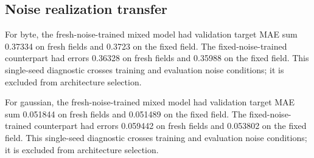 \subsection{Noise realization transfer}

For byte, the fresh-noise-trained mixed model had validation target MAE sum 0.37334 on fresh fields and 0.3723 on the fixed field. The fixed-noise-trained counterpart had errors 0.36328 on fresh fields and 0.35988 on the fixed field. This single-seed diagnostic crosses training and evaluation noise conditions; it is excluded from architecture selection.

For gaussian, the fresh-noise-trained mixed model had validation target MAE sum 0.051844 on fresh fields and 0.051489 on the fixed field. The fixed-noise-trained counterpart had errors 0.059442 on fresh fields and 0.053802 on the fixed field. This single-seed diagnostic crosses training and evaluation noise conditions; it is excluded from architecture selection.
